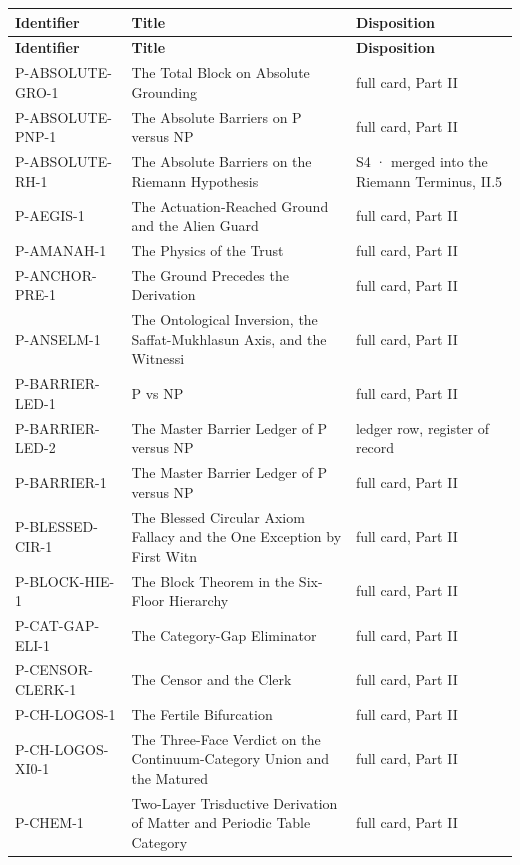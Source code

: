 \documentclass[10pt,twocolumn]{article}
\begin{document}
\begin{center}\small
\begin{longtable}{>{\raggedright\arraybackslash}p{}>{\raggedright\arraybackslash}p{}>{\raggedright\arraybackslash}p{}}
\toprule
\textbf{Identifier} & \textbf{Title} & \textbf{Disposition} \\
\midrule
\endfirsthead
\toprule
\textbf{Identifier} & \textbf{Title} & \textbf{Disposition} \\
\midrule
\endhead
\bottomrule
\endfoot
P-ABSOLUTE-GRO-1 & The Total Block on Absolute Grounding & full card, Part II \\
P-ABSOLUTE-PNP-1 & The Absolute Barriers on P versus NP & full card, Part II \\
P-ABSOLUTE-RH-1 & The Absolute Barriers on the Riemann Hypothesis & S4 · merged into the Riemann Terminus, II.5 \\
P-AEGIS-1 & The Actuation-Reached Ground and the Alien Guard & full card, Part II \\
P-AMANAH-1 & The Physics of the Trust & full card, Part II \\
P-ANCHOR-PRE-1 & The Ground Precedes the Derivation & full card, Part II \\
P-ANSELM-1 & The Ontological Inversion, the Saffat-Mukhlasun Axis, and the Witnessi & full card, Part II \\
P-BARRIER-LED-1 & P vs NP & full card, Part II \\
P-BARRIER-LED-2 & The Master Barrier Ledger of P versus NP & ledger row, register of record \\
P-BARRIER-1 & The Master Barrier Ledger of P versus NP & full card, Part II \\
P-BLESSED-CIR-1 & The Blessed Circular Axiom Fallacy and the One Exception by First Witn & full card, Part II \\
P-BLOCK-HIE-1 & The Block Theorem in the Six-Floor Hierarchy & full card, Part II \\
P-CAT-GAP-ELI-1 & The Category-Gap Eliminator & full card, Part II \\
P-CENSOR-CLERK-1 & The Censor and the Clerk & full card, Part II \\
P-CH-LOGOS-1 & The Fertile Bifurcation & full card, Part II \\
P-CH-LOGOS-XI0-1 & The Three-Face Verdict on the Continuum-Category Union and the Matured & full card, Part II \\
P-CHEM-1 & Two-Layer Trisductive Derivation of Matter and Periodic Table Category & full card, Part II \\

\end{longtable}
\end{center}
\end{document}
